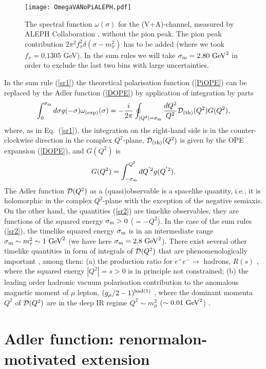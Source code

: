 \documentclass[aps,nofootinbib,showkeys,noshowpacs,preprintnumbers,amsmath,amssymb]{revtex4}
\def\be{\begin{equation}}
\def\ee{\end{equation}}
\newcommand{\sm}{{\sigma_{\rm m}}}
\begin{document}
\begin{figure}[htb] %
  \centering\texttt{[image: OmegaVANoPiALEPH.pdf]}
\vspace{-0.2cm}
\caption{\footnotesize  The spectral function $\omega(\sigma)$ for the (V+A)-channel, measured by ALEPH Collaboration \cite{ALEPH2,DDHMZ,ALEPHfin,ALEPHwww}, without the pion peak. The pion peak contribution $2 \pi^2 f^2_{\pi} \delta(\sigma - m^2_{\pi})$ has to be added (where we took $f_{\pi}=0.1305$ GeV). In the sum rules we will take $\sm =2.80 \ {\rm GeV}^2$ in order to exclude the last two bins with large uncertainties.}
\label{FigOmega}
\end{figure}
In the sum rule (\ref{sr1}) the theoretical polarisation function (\ref{PiOPE}) can be replaced by the Adler function (\ref{DOPE}) by application of integration by parts
\be
\int_0^{\sm} d \sigma g(-\sigma) \omega_{\rm (exp)}(\sigma)  =
-\frac{i}{2 \pi}   \oint_{|Q^2|=\sm}
\frac{d Q^2}{Q^2} {\cal D}_{\rm (th)}(Q^2) G(Q^2) ,
\label{sr2}
\ee
where, as in Eq.~(\ref{sr1}), the integration on the right-hand side is in the counter-clockwise direction in the complex $Q^2$-plane, ${\cal D}_{\rm (th)}(Q^2)$ is given by the OPE expansion (\ref{DOPE}), and 
$G(Q^2)$ is 
\be
G(Q^2)= \int_{-\sm}^{Q^2} d Q^{'2} g(Q^{'2}).
\label{GQ2}
\ee
The Adler function ${\cal D}(Q^2)$ as a (quasi)observable is a spacelike quantity, i.e., it is holomorphic in the complex $Q^2$-plane with the exception of the negative semiaxis. On the other hand, the quantities (\ref{sr2}) are timelike observables, they are functions of the squared energy $\sm >0$ ($=-Q^2$). In the case of the sum rules (\ref{sr2}), the timelike squared energy $\sm$ is in an intermediate range $\sm \sim m_{\tau}^2 \sim 1 \ {\rm GeV}^2$ (we have here $\sm=2.8 \ {\rm GeV}^2$). There exist several other timelike quantities in form of integrals of ${\cal D}(Q^2)$ that are phenomenologically important \cite{Nesterenko:2016pmx}, among them: (a) the production ratio for $e^+ e^- \to$ hadrons, $R(s)$ \cite{AKR,ANR}, where the squared energy $|Q^2|=s>0$ is in principle not constrained; (b) the leading order hadronic vacuum polarisation contribution to the anomalous magnetic moment of $\mu$ lepton,  $(g_{\mu}/2-1)^{\rm had(1)}$ \cite{amurev,amuZoltan}, where the dominant momenta $Q^2$ of ${\cal D}(Q^2)$ are in the deep IR regime $Q^2 \sim m^2_{\mu}$ ($\sim 0.01 \ {\rm GeV}^2$) \cite{NestJPG42,amuO}.

\section{Adler function: renormalon-motivated extension}
\label{sec:AdlRM}
\end{document}

